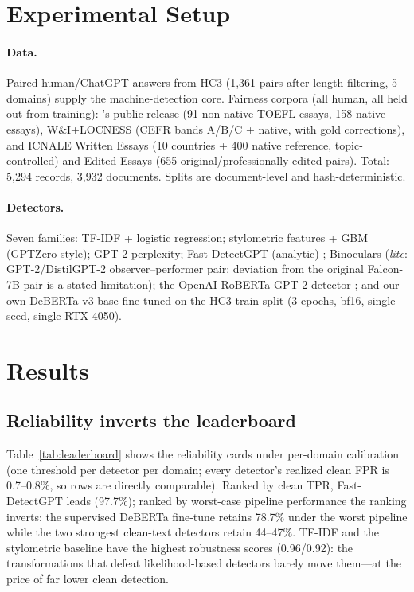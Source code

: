 \documentclass[11pt]{article}
\begin{document}
\section{Experimental Setup}
\label{sec:setup}

\paragraph{Data.} Paired human/ChatGPT answers from HC3 \citep{guo2023hc3}
(1,361 pairs after length filtering, 5 domains) supply the machine-detection
core. Fairness corpora (all human, all held out from training):
\citet{liang2023gpt}'s public release (91 non-native TOEFL essays, 158 native
essays), W\&I+LOCNESS \citep{bryant2019bea} (CEFR bands A/B/C + native, with
gold corrections), and ICNALE \citep{ishikawa2023icnale} Written Essays
(10 countries + 400 native reference, topic-controlled) and Edited Essays
(655 original/professionally-edited pairs). Total: 5,294 records, 3,932
documents. Splits are document-level and hash-deterministic.

\paragraph{Detectors.} Seven families: TF-IDF + logistic regression;
stylometric features + GBM (GPTZero-style); GPT-2 perplexity; Fast-DetectGPT
(analytic) \citep{bao2024fastdetectgpt}; Binoculars \citep{hans2024binoculars}
(\emph{lite}: GPT-2/DistilGPT-2 observer--performer pair; deviation from the
original Falcon-7B pair is a stated limitation); the OpenAI RoBERTa GPT-2
detector \citep{solaiman2019release}; and our own DeBERTa-v3-base
\citep{he2023debertav3} fine-tuned on the HC3 train split (3 epochs, bf16,
single seed, single RTX 4050).

\section{Results}
\label{sec:results}

\subsection{Reliability inverts the leaderboard}
\label{sec:inversion}

Table~\ref{tab:leaderboard} shows the reliability cards under per-domain
calibration (one threshold per detector per domain; every detector's realized
clean FPR is 0.7--0.8\%, so rows are directly comparable). Ranked by clean
TPR, Fast-DetectGPT leads (97.7\%); ranked by worst-case pipeline performance
the ranking inverts: the supervised DeBERTa fine-tune retains 78.7\% under the
worst pipeline while the two strongest clean-text detectors retain 44--47\%.
TF-IDF and the stylometric baseline have the highest robustness scores
(0.96/0.92): the transformations that defeat likelihood-based detectors barely
move them---at the price of far lower clean detection.
\end{document}
